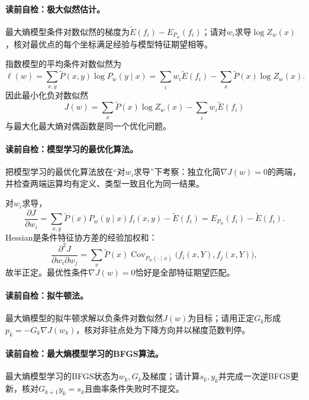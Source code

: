 \paragraph{读前自检：极大似然估计。}最大熵模型条件对数似然的梯度为$\widetilde E(f_i)-E_{P_w}(f_i)$；请对$w_i$求导$\log Z_w(x)$，核对最优点的每个坐标满足经验与模型特征期望相等。\par

指数模型的平均条件对数似然为
\[
\ell(w)=\sum_{x,y}\widetilde P(x,y)\log P_w(y\mid x)
=\sum_iw_i\widetilde E(f_i)-\sum_x\widetilde P(x)\log Z_w(x).
\]
因此最小化负对数似然
\[
J(w)=\sum_x\widetilde P(x)\log Z_w(x)-\sum_iw_i\widetilde E(f_i)
\]
与最大化最大熵对偶函数是同一个优化问题。

\paragraph{读前自检：模型学习的最优化算法。}把模型学习的最优化算法放在“对$w_i$求导”下考察：独立化简$\nabla J(w)=0$的两端，并检查两端运算均有定义、类型一致且化为同一结果。\par

对$w_i$求导，
\[
\frac{\partial J}{\partial w_i}
=\sum_{x,y}\widetilde P(x)P_w(y\mid x)f_i(x,y)-\widetilde E(f_i)
=E_{P_w}(f_i)-\widetilde E(f_i).
\]
Hessian是条件特征协方差的经验加权和：
\[
\frac{\partial^2J}{\partial w_i\partial w_j}
=\sum_x\widetilde P(x)\operatorname{Cov}_{P_w(\cdot\mid x)}
\!\bigl(f_i(x,Y),f_j(x,Y)\bigr),
\]
故半正定。最优性条件$\nabla J(w)=0$恰好是全部特征期望匹配。

\paragraph{读前自检：拟牛顿法。}最大熵模型的拟牛顿求解以负条件对数似然$J(w)$为目标；请用正定$G_k$形成$p_k=-G_k\nabla J(w_k)$，核对非驻点处为下降方向并以梯度范数判停。\par
\paragraph{读前自检：最大熵模型学习的BFGS算法。}最大熵模型学习的BFGS状态为$w_k,G_k$及梯度；请计算$s_k,y_k$并完成一次逆BFGS更新，核对$G_{k+1}y_k=s_k$且曲率条件失败时不提交。\par

